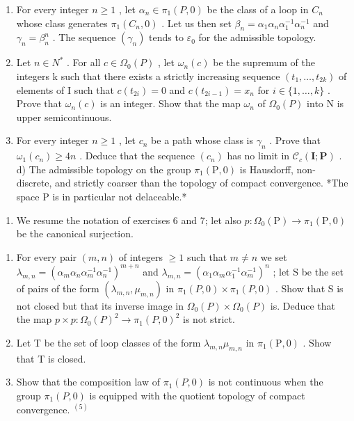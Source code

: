 \begin{enumerate}
\def\labelenumi{\alph{enumi})}
\item
  For every integer \(n \geqslant 1\) , let \(\alpha_{n} \in \pi_{1}(P,0)\) be the class of a loop in \(C_{n}\) whose class generates \(\pi_{1}(C_{n},0)\) . Let us then set \(\beta_{n} = \alpha_{1}\alpha_{n}\alpha_{1}^{-1}\alpha_{n}^{-1}\) and \(\gamma_{n} = \beta_{n}^{n}\) . The sequence \((\gamma_{n})\) tends to \(\varepsilon_{0}\) for the admissible topology.
\item
  Let \(n \in N^{*}\) . For all \(c \in \Omega_{0}(P)\) , let \(\omega_{n}(c)\) be the supremum of the integers k such that there exists a strictly increasing sequence \((t_{1}, \ldots, t_{2k})\) of elements of I such that \(c(t_{2i}) = 0\) and \(c(t_{2i-1}) = x_{n}\) for \(i \in \{1, \ldots, k\}\) . Prove that \(\omega_{n}(c)\) is an integer. Show that the map \(\omega_{n}\) of \(\Omega_{0}(P)\) into N is upper semicontinuous.
\item
  For every integer \(n \geqslant 1\) , let \(c_{n}\) be a path whose class is \(\gamma_{n}\) . Prove that \(\omega_{1}(c_{n}) \geqslant 4n\) . Deduce that the sequence \((c_{n})\) has no limit in \(\mathcal{C}_{c}(\mathbf{I};\mathbf{P})\) . d) The admissible topology on the group \(\pi_{1}(\mathrm{P},0)\) is Hausdorff, non-discrete, and strictly coarser than the topology of compact convergence. *The space P is in particular not delaceable.*
\end{enumerate}

\begin{enumerate}
\def\labelenumi{\arabic{enumi})}
\setcounter{enumi}{7}
\tightlist
\item
  We resume the notation of exercises 6 and 7; let also \(p\colon \Omega_{0}(\mathrm{P})\to\pi_1(\mathrm{P},0)\) be the canonical surjection.
\end{enumerate}

\begin{enumerate}
\def\labelenumi{\alph{enumi})}
\item
  For every pair \((m,n)\) of integers \(\geqslant 1\) such that \(m \neq n\) we set \(\lambda_{m,n} = (\alpha_{m}\alpha_{n}\alpha_{m}^{-1}\alpha_{n}^{-1})^{m+n}\) and \(\lambda_{m,n} = (\alpha_{1}\alpha_{m}\alpha_{1}^{-1}\alpha_{m}^{-1})^{n}\) ; let S be the set of pairs of the form \((\lambda_{m,n},\mu_{m,n})\) in \(\pi_{1}(P,0)\times\pi_{1}(P,0)\) . Show that S is not closed but that its inverse image in \(\Omega_{0}(P)\times\Omega_{0}(P)\) is. Deduce that the map \(p\times p\colon\Omega_{0}(P)^{2}\to\pi_{1}(P,0)^{2}\) is not strict.
\item
  Let T be the set of loop classes of the form \(\lambda_{m,n}\mu_{m,n}\) in \(\pi_1(\mathrm{P},0)\) . Show that T is closed.
\item
  Show that the composition law of \(\pi_{1}(P,0)\) is not continuous when the group \(\pi_{1}(P,0)\) is equipped with the quotient topology of compact convergence. \(^{(5)}\)
\end{enumerate}

